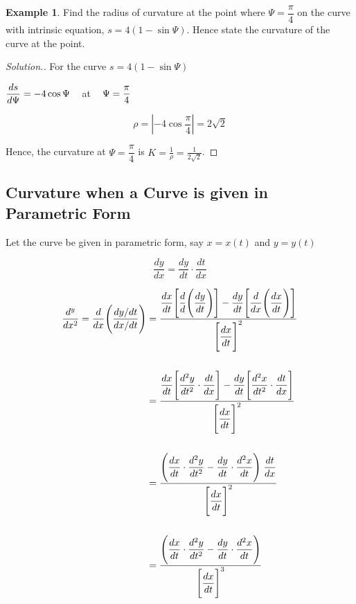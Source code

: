 \documentclass[11pt,a4paper]{article}
\theoremstyle{definition}
\newtheorem{exa}[thm]{Example}
\newenvironment{solution}
  {\renewcommand{\qedsymbol}{}\begin{proof}[\textit{Solution}.]}
  {\end{proof}}
\begin{document}
\begin{exa}


Find the radius of curvature at the point where $\Psi = \dfrac{\pi}{4}$ on the curve with intrinsic equation, $s = 4(1 - \sin \Psi)$. Hence state the curvature of the curve at the point.
\end{exa}


\begin{solution}


For the curve $s = 4(1 - \sin \Psi)$


$\displaystyle{\frac{ds}{d\Psi} = - 4\cos \Psi}\hspace{0.3cm}$ at $\hspace{0.3cm}\Psi = \dfrac{\pi}{4}$

$$\rho = \left|-4\cos \dfrac{\pi}{4}\right| = 2\sqrt{2}$$

Hence, the curvature at $\Psi = \dfrac{\pi}{4}$ is $\displaystyle{K = \frac{1}{\rho} =\frac{1}{2\sqrt{2}}}$.
\end{solution}


\subsection{Curvature when a Curve is given in Parametric Form}
Let the curve be given in parametric form, say $x = x(t)$ and $y = y(t)$

$$\frac{dy}{dx} = \frac{dy}{dt}\cdot \frac{dt}{dx}$$

\begin{align*}
\frac{d^y}{dx^2}  = \frac{d}{dx}\Bigg(\dfrac{dy/dt}{dx/dt}\Bigg) & =\frac{\dfrac{dx}{dt}\Bigg[\dfrac{d}{d}\Bigg(\dfrac{dy}{dt}\Bigg)\Bigg]- \dfrac{dy}{dt}\Bigg[\dfrac{d}{dx}\Bigg(\dfrac{dx}{dt}\Bigg)\Bigg]
}{\Bigg[\dfrac{dx}{dt}\Bigg]^2}\\\\
& = \frac{\dfrac{dx}{dt}\Bigg[\dfrac{d^2y}{dt^2}\cdot\dfrac{dt}{dx}\Bigg]-\dfrac{dy}{dt}\Bigg[\dfrac{d^2x}{dt^2}\cdot\dfrac{dt}{dx}\Bigg]}{\Bigg[\dfrac{dx}{dt}\Bigg]^2}\\\\
& = \frac{\Bigg(\dfrac{dx}{dt}\cdot\dfrac{d^2y}{dt^2}- \dfrac{dy}{dt}\cdot\dfrac{d^2x}{dt}\Bigg)\hspace{0.1cm}\dfrac{dt}{dx}}{\Bigg[\dfrac{dx}{dt}\Bigg]^2}\\\\
& = \frac{\Bigg(\dfrac{dx}{dt}\cdot\dfrac{d^2y}{dt^2}- \dfrac{dy}{dt}\cdot\dfrac{d^2x}{dt}\Bigg)}{\Bigg[\dfrac{dx}{dt}\Bigg]^3}\\ 
\end{align*}
\end{document}

